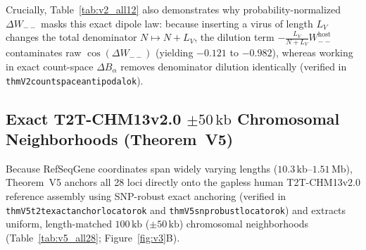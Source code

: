 \documentclass[11pt, a4paper]{article}
\DeclareRobustCommand{\_}{\textunderscore\allowbreak}
\begin{document}
Crucially, Table~\ref{tab:v2_all12} also demonstrates why probability-normalized $\Delta W_{--}$ masks this exact dipole law: because inserting a virus of length $L_V$ changes the total denominator $N \mapsto N + L_V$, the dilution term $-\frac{L_V}{N + L_V} W_{--}^{\mathrm{host}}$ contaminates raw $\cos(\Delta W_{--})$ (yielding $-0.121$ to $-0.982$), whereas working in exact count-space $\Delta B_\alpha$ removes denominator dilution identically (verified in \texttt{thmV2\_count\_space\_antipodal\_ok}).

\subsection{Exact T2T-CHM13v2.0 $\pm 50\,\mathrm{kb}$ Chromosomal Neighborhoods (Theorem~V5)}

Because RefSeqGene coordinates span widely varying lengths ($10.3\,\mathrm{kb}\text{--}1.51\,\mathrm{Mb}$), Theorem~V5 anchors all 28 loci directly onto the gapless human T2T-CHM13v2.0 reference assembly using SNP-robust exact anchoring (verified in \texttt{thmV5\_t2t\_exact\_anchor\_locator\_ok} and \texttt{thmV5\_snp\_robust\_locator\_ok}) and extracts uniform, length-matched $100\,\mathrm{kb}$ ($\pm 50\,\mathrm{kb}$) chromosomal neighborhoods (Table~\ref{tab:v5_all28}; Figure~\ref{fig:v3}B).
\end{document}
